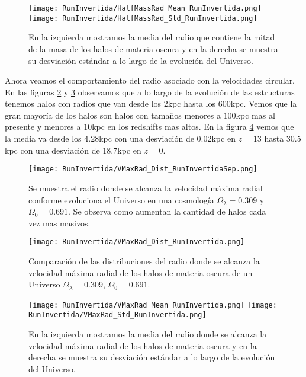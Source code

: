 \begin{figure}[H]
    \centering
    \texttt{[image: RunInvertida/HalfMassRad\_Mean\_RunInvertida.png]}
    \texttt{[image: RunInvertida/HalfMassRad\_Std\_RunInvertida.png]}
    \caption[Media y desviación estándar del radio de la mitad de la masa]{\footnotesize En la izquierda mostramos la media del radio que contiene la mitad de la masa de los halos de materia oscura y en la derecha se muestra su desviación estándar a lo largo de la evolución del Universo.}
    \label{fig:Invertida-HalfMassRadStats}
\end{figure}

Ahora veamos el comportamiento del radio asociado con la velocidades circular. En las figuras \ref{fig:Invertida-VMaxRadDistSep} y \ref{fig:Invertida-VMaxRadDist} observamos que a lo largo de la evolución de las estructuras tenemos halos con radios que van desde los $2$kpc hasta los $600$kpc. Vemos que la gran mayoría de los halos son halos con tamaños menores a $100$kpc mas al presente y menores a $10$kpc en los redshifts mas altos. En la figura \ref{fig:Invertida-VMaxRadStats} vemos que la media va desde los $4.28$kpc con una desviación de $0.02$kpc en $z=13$ hasta $30.5$kpc con una desviación de $18.7$kpc en $z=0$.

\begin{figure}[H]
    \centering
    \texttt{[image: RunInvertida/VMaxRad\_Dist\_RunInvertidaSep.png]}
    \caption[Radio donde se alcanza la velocidad máxima radial]{\footnotesize Se muestra el radio donde se alcanza la velocidad máxima radial conforme evoluciona el Universo en una cosmología $\Omega_\lambda = 0.309 $ y $\Omega_0 = 0.691$. Se observa como aumentan la cantidad de halos cada vez mas masivos.}
    \label{fig:Invertida-VMaxRadDistSep}
\end{figure}

\begin{figure}[H]
    \centering
    \texttt{[image: RunInvertida/VMaxRad\_Dist\_RunInvertida.png]}
    \caption[Distribución del radio donde se alcanza la velocidad máxima radial]{\footnotesize Comparación de las distribuciones del radio donde se alcanza la velocidad máxima radial de los halos de materia oscura de un Universo $\Omega_\lambda = 0.309 $, $\Omega_0 = 0.691$.}
    \label{fig:Invertida-VMaxRadDist}
\end{figure}

\begin{figure}[H]
    \centering
    \texttt{[image: RunInvertida/VMaxRad\_Mean\_RunInvertida.png]}
    \texttt{[image: RunInvertida/VMaxRad\_Std\_RunInvertida.png]}
    \caption[Media y desviación estándar del Radio donde se alcanza la velocidad máxima radial]{\footnotesize En la izquierda mostramos la media del radio donde se alcanza la velocidad máxima radial de los halos de materia oscura y en la derecha se muestra su desviación estándar a lo largo de la evolución del Universo.}
    \label{fig:Invertida-VMaxRadStats}
\end{figure}

